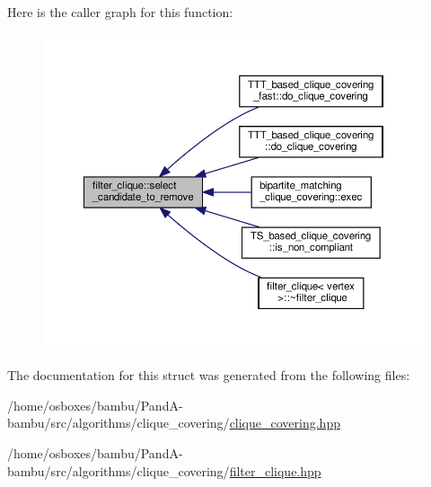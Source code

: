 Here is the caller graph for this function\+:
\nopagebreak
\begin{figure}[H]
\begin{center}
\leavevmode
\includegraphics[width=350pt]{db/deb/structfilter__clique_aaeef789b709e45c93269c6b137ea00ff_icgraph}
\end{center}
\end{figure}


The documentation for this struct was generated from the following files\+:\begin{DoxyCompactItemize}
\item 
/home/osboxes/bambu/\+Pand\+A-\/bambu/src/algorithms/clique\+\_\+covering/\hyperlink{clique__covering_8hpp}{clique\+\_\+covering.\+hpp}\item 
/home/osboxes/bambu/\+Pand\+A-\/bambu/src/algorithms/clique\+\_\+covering/\hyperlink{filter__clique_8hpp}{filter\+\_\+clique.\+hpp}\end{DoxyCompactItemize}
